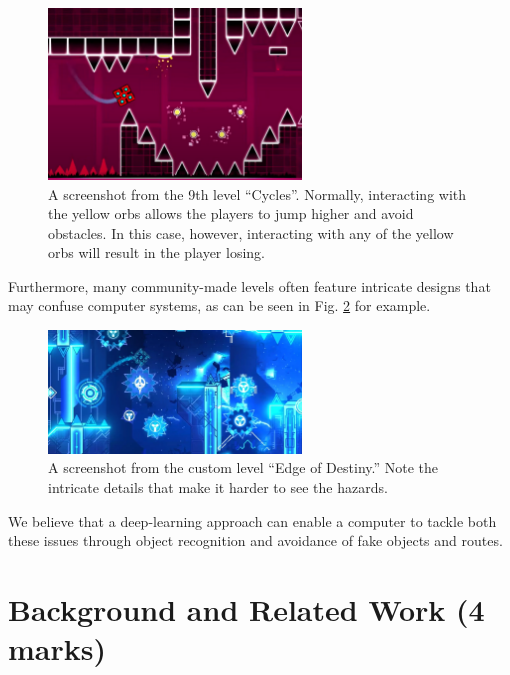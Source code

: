\documentclass{article} %
\begin{document}
\begin{figure}[h]
\begin{center}
\includegraphics[width=0.6\textwidth]{Figs/GeoDash_Cycles_False_jump.png}
\end{center}
\caption{A screenshot from the 9th level “Cycles”. 
Normally, interacting with the yellow orbs allows the
players to jump higher and avoid obstacles. In this case, 
however, interacting with any of the yellow orbs will result 
in the player losing. \citep{GD+cycles+screenshot}}
\label{fig:cycles_false_jump_img}
\end{figure}

Furthermore, many community-made levels often feature 
intricate designs that may confuse computer systems, as 
can be seen in Fig. \ref{fig:edge_of_destiny} for example.

\begin{figure}[h]
\begin{center}
\includegraphics[width=0.6\textwidth]{Figs/GeoDash_Level_ex.png}
\end{center}
\caption{A screenshot from the custom level “Edge of Destiny.” 
Note the intricate details that make it harder to see the hazards. 
\citep{GD+edge_of_destiny}}
\label{fig:edge_of_destiny}
\end{figure}

We believe that a deep-learning approach can enable a computer 
to tackle both these issues through object recognition and avoidance 
of fake objects and routes.

\section{Background and Related Work (4 marks)}
\end{document}
